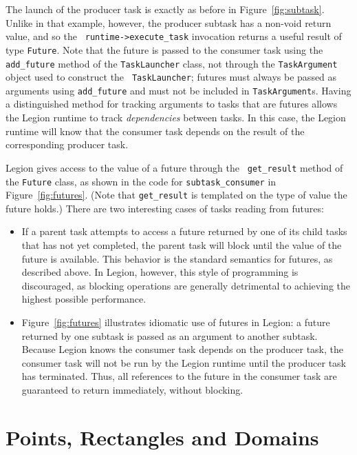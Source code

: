 The launch of the producer task is exactly as before in
Figure~\ref{fig:subtask}.  Unlike in that example, however, the
producer subtask has a non-void return value, and so the {\tt
  runtime->execute\_task} invocation returns a useful result of type
{\tt Future}.  Note that the future is passed to the consumer task
using the {\tt add\_future} method of the {\tt TaskLauncher} class, not
through the {\tt TaskArgument} object used to construct the {\tt
  TaskLauncher}; futures must always be passed as arguments using {\tt add\_future}
and must not be included in {\tt TaskArgument}s.  Having a distinguished method for tracking arguments
to tasks that are futures allows the Legion runtime to track 
{\em dependencies} between tasks.  In this case, the Legion runtime 
will know that the consumer task depends on the result of the corresponding
producer task.

Legion gives access to the value of a future through the {\tt
  get\_result} method of the {\tt Future} class, as shown in the code
for {\tt subtask\_consumer} in Figure~\ref{fig:futures}.  (Note that
{\tt get\_result} is templated on the type of value the future holds.)
There are two interesting cases of tasks reading from futures:
\begin{itemize}

\item If a parent task attempts to access a future returned
by one of its child tasks that has not yet completed, the parent task
will block until the value of the future is available.  This behavior is the
standard semantics for futures, as described above.  In Legion, however,
this style of programming is discouraged, as blocking operations are 
generally detrimental to achieving the highest possible performance.

\item Figure~\ref{fig:futures} illustrates idiomatic use of futures in Legion:
a future returned by one subtask is passed as an argument to another subtask.
Because Legion knows the consumer task depends on the producer task, the consumer
task will not be run by the Legion runtime until the producer task has terminated.
Thus, all references to the future in the consumer task are guaranteed to 
return immediately, without blocking.

\end{itemize}

\section{Points, Rectangles and Domains}

